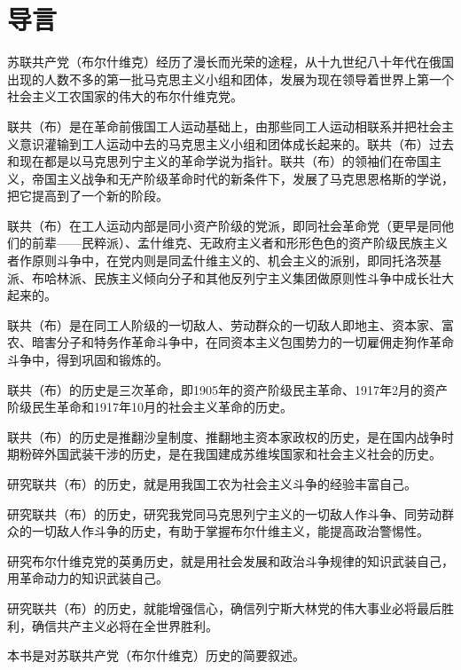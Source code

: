 \section{导言}

苏联共产党（布尔什维克）经历了漫长而光荣的途程，从十九世纪八十年代在俄国出现的人数不多的第一批马克思主义小组和团体，发展为现在领导着世界上第一个社会主义工农国家的伟大的布尔什维克党。

联共（布）是在革命前俄国工人运动基础上，由那些同工人运动相联系并把社会主义意识灌输到工人运动中去的马克思主义小组和团体成长起来的。联共（布）过去和现在都是以马克思列宁主义的革命学说为指针。联共（布）的领袖们在帝国主义，帝国主义战争和无产阶级革命时代的新条件下，发展了马克思恩格斯的学说，把它提高到了一个新的阶段。

联共（布）在工人运动内部是同小资产阶级的党派，即同社会革命党（更早是同他们的前辈——民粹派）、孟什维克、无政府主义者和形形色色的资产阶级民族主义者作原则斗争中，在党内则是同孟什维主义的、机会主义的派别，即同托洛茨基派、布哈林派、民族主义倾向分子和其他反列宁主义集团做原则性斗争中成长壮大起来的。

联共（布）是在同工人阶级的一切敌人、劳动群众的一切敌人即地主、资本家、富农、暗害分子和特务作革命斗争中，在同资本主义包围势力的一切雇佣走狗作革命斗争中，得到巩固和锻炼的。

联共（布）的历史是三次革命，即1905年的资产阶级民主革命、1917年2月的资产阶级民生革命和1917年10月的社会主义革命的历史。

联共（布）的历史是推翻沙皇制度、推翻地主资本家政权的历史，是在国内战争时期粉碎外国武装干涉的历史，是在我国建成苏维埃国家和社会主义社会的历史。

研究联共（布）的历史，就是用我国工农为社会主义斗争的经验丰富自己。

研究联共（布）的历史，研究我党同马克思列宁主义的一切敌人作斗争、同劳动群众的一切敌人作斗争的历史，有助于掌握布尔什维主义，能提高政治警惕性。

研究布尔什维克党的英勇历史，就是用社会发展和政治斗争规律的知识武装自己，用革命动力的知识武装自己。

研究联共（布）的历史，就能增强信心，确信列宁斯大林党的伟大事业必将最后胜利，确信共产主义必将在全世界胜利。

本书是对苏联共产党（布尔什维克）历史的简要叙述。


